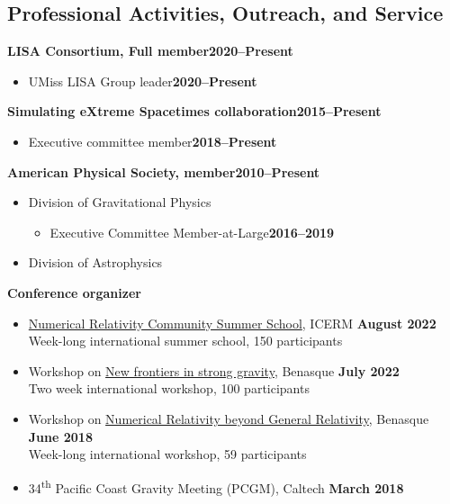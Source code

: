 \documentclass[margin,line]{res}
\begin{document}
\begin{resume}
\section{\sc Professional Activities, Outreach, and Service}
{\bf LISA Consortium, Full member}\hfill{\bf 2020--Present}
\begin{itemize}
\item[] UMiss LISA Group leader\hfill{\bf 2020--Present}
\end{itemize}
{\bf Simulating eXtreme Spacetimes collaboration}\hfill{\bf 2015--Present}
\begin{itemize}
\item[] Executive committee member\hfill{\bf 2018--Present}
\end{itemize}
{\bf American Physical Society, member}\hfill{\bf 2010--Present}
\begin{itemize}
\item[] Division of Gravitational Physics
  \begin{itemize}
  \item[] Executive Committee Member-at-Large\hfill{\bf 2016--2019}
  \end{itemize}
\item[] Division of Astrophysics
\end{itemize}
{\bf Conference organizer}
\vspace*{.05in}
\begin{itemize}
\item[]
  \href{https://icerm.brown.edu/events/re-22-f20w1/}
  {Numerical Relativity Community Summer School},
  ICERM \hfill {\bf August 2022} \\
\hspace*{1em} Week-long international summer school, 150 participants
\item[] Workshop on
  \href{https://www.benasque.org/2022relativity/}{New frontiers in
    strong gravity},
  Benasque \hfill {\bf July 2022} \\
\hspace*{1em} Two week international workshop, 100 participants
\item[] Workshop on
  \href{http://www.benasque.org/2018relativity/}{Numerical Relativity
    beyond General Relativity},
  Benasque \hfill {\bf June 2018} \\
\hspace*{1em} Week-long international workshop, 59 participants
\item[]
34\textsuperscript{th} Pacific Coast Gravity Meeting (PCGM),
Caltech
\hfill {\bf March 2018}\\

\end{itemize}
\end{resume}
\end{document}
